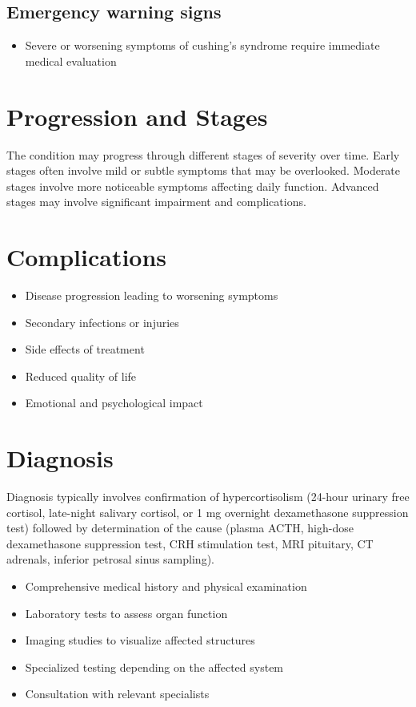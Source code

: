 \subsection{Emergency warning signs}
\begin{itemize}[noitemsep]
  \item Severe or worsening symptoms of cushing's syndrome require immediate medical evaluation
\end{itemize}
\section{Progression and Stages}
The condition may progress through different stages of severity over time. Early stages often involve mild or subtle symptoms that may be overlooked. Moderate stages involve more noticeable symptoms affecting daily function. Advanced stages may involve significant impairment and complications.
\section{Complications}
\begin{itemize}[noitemsep]
  \item Disease progression leading to worsening symptoms
  \item Secondary infections or injuries
  \item Side effects of treatment
  \item Reduced quality of life
  \item Emotional and psychological impact
\end{itemize}
\section{Diagnosis}
Diagnosis typically involves confirmation of hypercortisolism (24-hour urinary free cortisol, late-night salivary cortisol, or 1 mg overnight dexamethasone suppression test) followed by determination of the cause (plasma ACTH, high-dose dexamethasone suppression test, CRH stimulation test, MRI pituitary, CT adrenals, inferior petrosal sinus sampling).

\begin{itemize}[noitemsep]
  \item Comprehensive medical history and physical examination
  \item Laboratory tests to assess organ function
  \item Imaging studies to visualize affected structures
  \item Specialized testing depending on the affected system
  \item Consultation with relevant specialists
\end{itemize}
